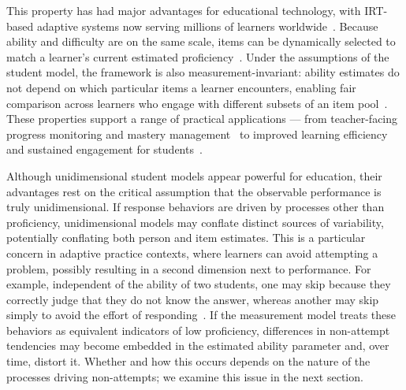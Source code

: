 \documentclass[11pt]{article}
\begin{document}
This property has had major advantages for educational technology, with IRT-based adaptive systems now serving millions of learners worldwide~\parencite{brinkhuis2018learning, pelanek2016applications, settles2020machine}. Because ability and difficulty are on the same scale, items can be dynamically selected to match a learner's current estimated proficiency~\parencite{weiss1982improving, magis2017computerized}. Under the assumptions of the student model, the framework is also measurement-invariant: ability estimates do not depend on which particular items a learner encounters, enabling fair comparison across learners who engage with different subsets of an item pool~\parencite{rasch1993probabilistic, wright1982rating}. These properties support a range of practical applications — from teacher-facing progress monitoring and mastery management~\parencite{maris2012speed, deonovic2018learning, saric-grgic2024twenty-five} to improved learning efficiency and sustained engagement for students~\parencite{eggen2006optimal, ma2014intelligent}.

Although unidimensional student models appear powerful for education, their advantages rest on the critical assumption that the observable performance is truly unidimensional. If response behaviors are driven by processes other than proficiency, unidimensional models may conflate distinct sources of variability, potentially conflating both person and item estimates. This is a particular concern in adaptive practice contexts, where learners can avoid attempting a problem, possibly resulting in a second dimension next to performance. For example, independent of the ability of two students, one may skip because they correctly judge that they do not know the answer, whereas another may skip simply to avoid the effort of responding~\parencite{aleven2000limitations}. If the measurement model treats these behaviors as equivalent indicators of low proficiency, differences in non-attempt tendencies may become embedded in the estimated ability parameter and, over time, distort it. Whether and how this occurs depends on the nature of the processes driving non-attempts; we examine this issue in the next section.  

\end{document}
